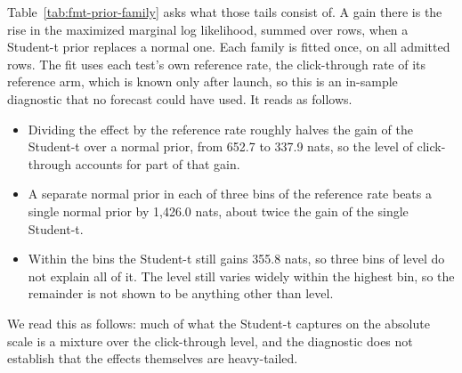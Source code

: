Table~\ref{tab:fmt-prior-family} asks what those tails consist of. A gain there is the rise in the maximized marginal log likelihood, summed over rows, when a Student-t prior replaces a normal one. Each family is fitted once, on all admitted rows. The fit uses each test's own reference rate, the click-through rate of its reference arm, which is known only after launch, so this is an in-sample diagnostic that no forecast could have used. It reads as follows.
\begin{itemize}
\item Dividing the effect by the reference rate roughly halves the gain of the Student-t over a normal prior, from 652.7 to 337.9 nats, so the level of click-through accounts for part of that gain.
\item A separate normal prior in each of three bins of the reference rate beats a single normal prior by 1,426.0 nats, about twice the gain of the single Student-t.
\item Within the bins the Student-t still gains 355.8 nats, so three bins of level do not explain all of it. The level still varies widely within the highest bin, so the remainder is not shown to be anything other than level.
\end{itemize}
We read this as follows: much of what the Student-t captures on the absolute scale is a mixture over the click-through level, and the diagnostic does not establish that the effects themselves are heavy-tailed.

